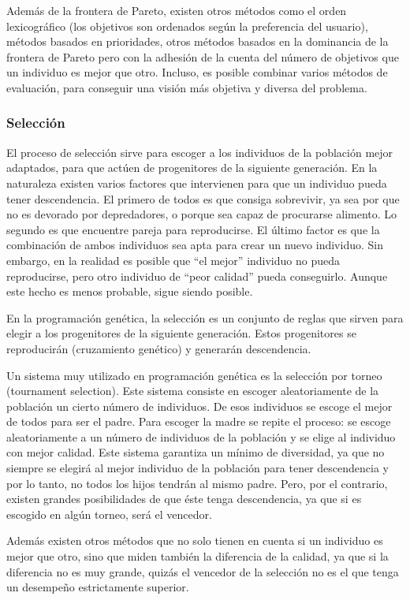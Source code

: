 Además de la frontera de Pareto, existen otros métodos como el orden lexicográfico (los objetivos son ordenados
según la preferencia del usuario),  métodos basados en prioridades, otros métodos basados en la dominancia de la
frontera de Pareto pero con la adhesión de la cuenta del número de objetivos que un individuo es mejor que otro.
Incluso, es posible combinar varios métodos de evaluación, para conseguir una visión más objetiva y diversa
del problema. 

\subsubsection{Selección}

El proceso de selección sirve para escoger a los individuos de la población mejor
adaptados, para que actúen de progenitores de la siguiente generación. En la
naturaleza existen varios factores que intervienen para que un individuo pueda
tener descendencia. El primero de todos es que consiga sobrevivir, ya sea por que no es
devorado por depredadores, o porque sea capaz de procurarse alimento. Lo segundo
es que encuentre pareja para reproducirse. El último factor es que la
combinación de ambos individuos sea apta para crear un nuevo individuo. Sin
embargo, en la realidad es posible que “el mejor” individuo no pueda
reproducirse, pero otro individuo de “peor calidad” pueda conseguirlo. Aunque
este hecho es menos probable, sigue siendo posible.

En la programación genética, la selección es un conjunto de reglas que sirven para elegir a los progenitores de
la siguiente generación. Estos progenitores se reproducirán (cruzamiento genético) y generarán descendencia.

Un sistema muy utilizado en programación genética es la selección por torneo (tournament selection).  Este
sistema consiste en escoger aleatoriamente de la población un cierto número de individuos. De esos individuos se
escoge el mejor de todos para ser el padre. Para escoger la madre se repite el proceso: se escoge aleatoriamente
a un número de individuos de la población y se elige al individuo con mejor calidad. Este sistema garantiza un
mínimo de diversidad, ya que no siempre se elegirá al mejor individuo de la población para tener descendencia y
por lo tanto, no todos los hijos tendrán al mismo padre. Pero, por el contrario, existen grandes posibilidades
de que éste tenga descendencia, ya que si es escogido en algún torneo, será el vencedor.

Además existen otros métodos que no solo tienen en cuenta si un individuo es mejor que otro, sino que miden
también la diferencia de la calidad, ya que si la diferencia no es muy grande, quizás el vencedor de la
selección no es el que tenga un desempeño estrictamente superior.


